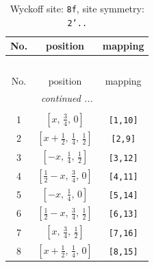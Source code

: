 \documentclass[fleqn,8pt]{jsarticle}
\begin{document}
\begin{longtable}{ccc}
\caption{Wyckoff site: {\tt 8f}, site symmetry: {\tt 2'..}}
 \\
 \hline \hline
No. & position & mapping \\ \hline \endfirsthead

\multicolumn{2}{l}{\tablename\ \thetable{}} \\
 \hline \hline
No. & position & mapping \\ \hline \endhead

 \hline \hline
\multicolumn{2}{r}{\footnotesize\it continued ...} \\ \endfoot

 \hline \hline
\multicolumn{2}{r}{} \\ \endlastfoot

1 & $\left[ x,\, \frac{3}{4},\, 0 \right]$ & {\tt [1,10]} \\ \hline
2 & $\left[ x + \frac{1}{2},\, \frac{1}{4},\, \frac{1}{2} \right]$ & {\tt [2,9]} \\ \hline
3 & $\left[ - x,\, \frac{1}{4},\, \frac{1}{2} \right]$ & {\tt [3,12]} \\ \hline
4 & $\left[ \frac{1}{2} - x,\, \frac{3}{4},\, 0 \right]$ & {\tt [4,11]} \\ \hline
5 & $\left[ - x,\, \frac{1}{4},\, 0 \right]$ & {\tt [5,14]} \\ \hline
6 & $\left[ \frac{1}{2} - x,\, \frac{3}{4},\, \frac{1}{2} \right]$ & {\tt [6,13]} \\ \hline
7 & $\left[ x,\, \frac{3}{4},\, \frac{1}{2} \right]$ & {\tt [7,16]} \\ \hline
8 & $\left[ x + \frac{1}{2},\, \frac{1}{4},\, 0 \right]$ & {\tt [8,15]} \\
\end{longtable}
\renewcommand{\arraystretch}{1.2}
\end{document}
